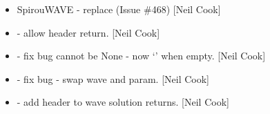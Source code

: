 \documentclass[a4paper,10pt,english]{report}
\begin{document}
\begin{itemize}
\item {} 
SpirouWAVE - replace  (Issue \#468) {[}Neil Cook{]}

\item {} 
 - allow header return. {[}Neil Cook{]}

\item {} 
 - fix bug  cannot be None - now ‘’ when empty.
{[}Neil Cook{]}

\item {} 
 - fix bug - swap wave and param. {[}Neil Cook{]}

\item {} 
 - add header to wave solution returns. {[}Neil
Cook{]}

\end{itemize}
\end{document}
